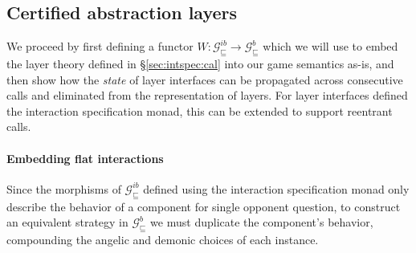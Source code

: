 \documentclass[sigplan,screen]{acmart}
\newcommand{\gcat}{\mathcal{G}_{\sqsubseteq}}
\begin{document}

\subsection{Certified abstraction layers} %

We proceed by first defining a functor
$W : \gcat^{ib} \rightarrow \gcat^b$
which we will use to embed the layer theory
defined in \S\ref{sec:intspec:cal}
into our game semantics as-is,
and then show how the \emph{state} of layer interfaces
can be propagated across consecutive calls and
eliminated from the representation of layers.
For layer interfaces defined the interaction specification monad,
this can be extended to support reentrant calls.

\paragraph{Embedding flat interactions} %

Since the morphisms of $\gcat^{ib}$
defined using the interaction specification monad
only describe the behavior of a component
for single opponent question,
to construct an equivalent strategy in $\gcat^b$
we must duplicate the component's behavior,
compounding the angelic and demonic choices of each instance.
\end{document}
